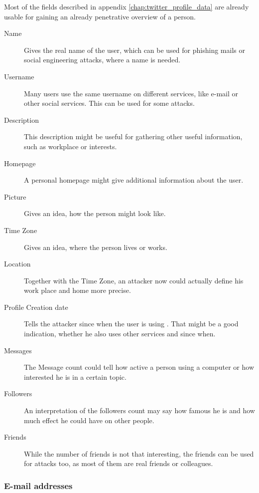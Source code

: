 Most of the fields described in appendix \ref{chap:twitter_profile_data} are
already usable for gaining an already penetrative overview of a person.

\begin{description}
\item[Name] Gives the real name of the user, which can be used for
phishing mails or social engineering attacks, where a name is needed.

\item[Username] Many users use the same username on different
services, like e-mail or other social services. This can be used for some
attacks.

\item[Description] This description might be useful for gathering other useful
information, such as workplace or interests.

\item[Homepage] A personal homepage might give additional
information about the user.

\item[Picture] Gives an idea, how the person might
look like.

\item[Time Zone] Gives an idea, where the person
lives or works.

\item[Location] Together with the Time Zone, an attacker now
could actually define his work place and home more precise.

\item[Profile Creation date] Tells the attacker
since when the user is using \Twitter{}. That might be a good indication,
whether he also uses other services and since when.

\item[Messages] The Message count could tell how active a person using a
computer or how interested he is in a certain topic.

\item[Followers] An interpretation of the followers count may say how
famous he is and how much effect he could have on other people.

\item[Friends] While the number of friends is not that interesting,
the friends can be used for attacks too, as most of them are real friends
or colleagues.
\end{description}

\subsubsection{E-mail addresses}


